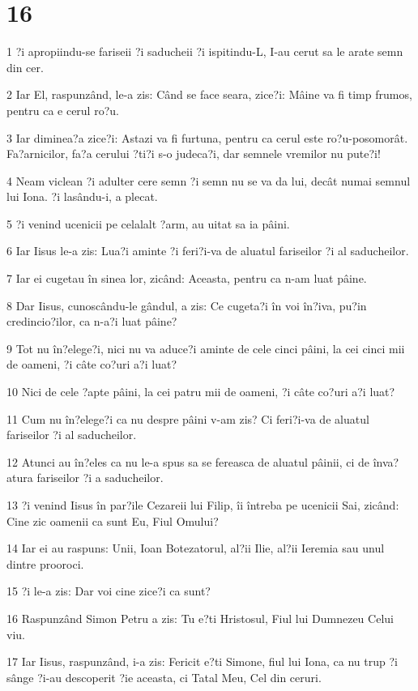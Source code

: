 \chapter{16}

\par 1 ?i apropiindu-se fariseii ?i saducheii ?i ispitindu-L, I-au cerut sa le arate semn din cer.
\par 2 Iar El, raspunzând, le-a zis: Când se face seara, zice?i: Mâine va fi timp frumos, pentru ca e cerul ro?u.
\par 3 Iar diminea?a zice?i: Astazi va fi furtuna, pentru ca cerul este ro?u-posomorât. Fa?arnicilor, fa?a cerului ?ti?i s-o judeca?i, dar semnele vremilor nu pute?i!
\par 4 Neam viclean ?i adulter cere semn ?i semn nu se va da lui, decât numai semnul lui Iona. ?i lasându-i, a plecat.
\par 5 ?i venind ucenicii pe celalalt ?arm, au uitat sa ia pâini.
\par 6 Iar Iisus le-a zis: Lua?i aminte ?i feri?i-va de aluatul fariseilor ?i al saducheilor.
\par 7 Iar ei cugetau în sinea lor, zicând: Aceasta, pentru ca n-am luat pâine.
\par 8 Dar Iisus, cunoscându-le gândul, a zis: Ce cugeta?i în voi în?iva, pu?in credincio?ilor, ca n-a?i luat pâine?
\par 9 Tot nu în?elege?i, nici nu va aduce?i aminte de cele cinci pâini, la cei cinci mii de oameni, ?i câte co?uri a?i luat?
\par 10 Nici de cele ?apte pâini, la cei patru mii de oameni, ?i câte co?uri a?i luat?
\par 11 Cum nu în?elege?i ca nu despre pâini v-am zis? Ci feri?i-va de aluatul fariseilor ?i al saducheilor.
\par 12 Atunci au în?eles ca nu le-a spus sa se fereasca de aluatul pâinii, ci de înva?atura fariseilor ?i a saducheilor.
\par 13 ?i venind Iisus în par?ile Cezareii lui Filip, îi întreba pe ucenicii Sai, zicând: Cine zic oamenii ca sunt Eu, Fiul Omului?
\par 14 Iar ei au raspuns: Unii, Ioan Botezatorul, al?ii Ilie, al?ii Ieremia sau unul dintre prooroci.
\par 15 ?i le-a zis: Dar voi cine zice?i ca sunt?
\par 16 Raspunzând Simon Petru a zis: Tu e?ti Hristosul, Fiul lui Dumnezeu Celui viu.
\par 17 Iar Iisus, raspunzând, i-a zis: Fericit e?ti Simone, fiul lui Iona, ca nu trup ?i sânge ?i-au descoperit ?ie aceasta, ci Tatal Meu, Cel din ceruri.

